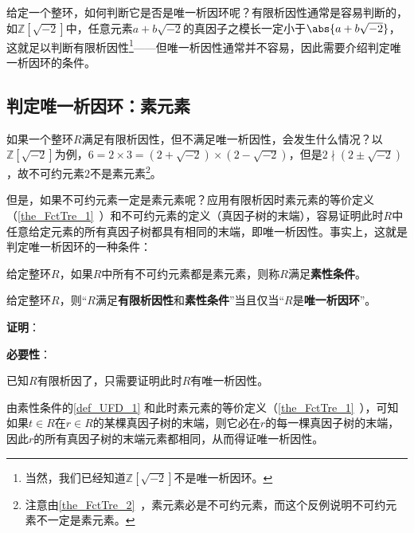 


给定一个整环，如何判断它是否是唯一析因环呢？有限析因性通常是容易判断的，如$\mathbb{Z}[\sqrt{-2}]$中，任意元素$a+b\sqrt{-2}$的真因子之模长一定小于$\abs{a+b\sqrt{-2}}$，这就足以判断有限析因性\footnote{当然，我们已经知道$\mathbb{Z}[\sqrt{-2}]$不是唯一析因环。}——但唯一析因性通常并不容易，因此需要介绍判定唯一析因环的条件。




\subsection{判定唯一析因环：素元素}



如果一个整环$R$满足有限析因性，但不满足唯一析因性，会发生什么情况？以$\mathbb{Z}[\sqrt{-2}]$为例，$6=2\times 3=(2+\sqrt{-2})\times(2-\sqrt{-2})$，但是$2\nmid(2\pm\sqrt{-2})$，故不可约元素$2$不是素元素\footnote{注意由\autoref{the_FctTre_2}~，素元素必是不可约元素，而这个反例说明不可约元素不一定是素元素。}。

但是，如果不可约元素一定是素元素呢？应用有限析因时素元素的等价定义（\autoref{the_FctTre_1}~）和不可约元素的定义（真因子树的末端），容易证明此时$R$中任意给定元素的所有真因子树都具有相同的末端，即唯一析因性。事实上，这就是判定唯一析因环的一种条件：



\begin{definition}{}\label{def_UFD_1}
给定整环$R$，如果$R$中所有不可约元素都是素元素，则称$R$满足\textbf{素性条件}。
\end{definition}


\begin{theorem}{}

给定整环$R$，则“$R$满足\textbf{有限析因性}和\textbf{素性条件}”当且仅当“$R$是\textbf{唯一析因环}”。

\end{theorem}


\textbf{证明}：

\textbf{必要性}：

已知$R$有限析因了，只需要证明此时$R$有唯一析因性。

由素性条件的\autoref{def_UFD_1}  和此时素元素的等价定义（\autoref{the_FctTre_1}~），可知如果$t\in R$在$r\in R$的某棵真因子树的末端，则它必在$r$的每一棵真因子树的末端，因此$r$的所有真因子树的末端元素都相同，从而得证唯一析因性。

